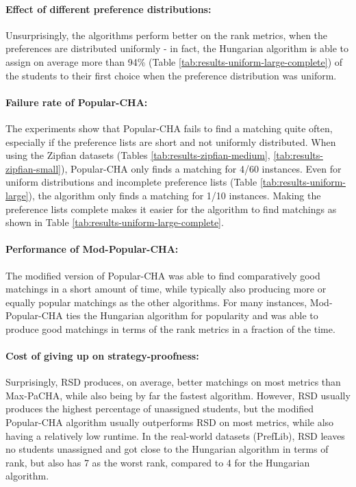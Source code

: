\paragraph{Effect of different preference distributions:} Unsurprisingly, the algorithms perform better on the rank metrics, when the preferences are distributed uniformly - in fact, the Hungarian algorithm is able to assign on average more than 94\% (Table \ref{tab:results-uniform-large-complete}) of the students to their first choice when the preference distribution was uniform.
\paragraph{Failure rate of Popular-CHA:} The experiments show that \mbox{Popular-CHA} fails to find a matching quite often, especially if the preference lists are short and not uniformly distributed. When using the Zipfian datasets (Tables \ref{tab:results-zipfian-medium}, \ref{tab:results-zipfian-small}), Popular-CHA only finds a matching for 4/60 instances. Even for uniform distributions and incomplete preference lists (Table \ref{tab:results-uniform-large}), the algorithm only finds a matching for 1/10 instances. Making the preference lists complete makes it easier for the algorithm to find matchings as shown in Table \ref{tab:results-uniform-large-complete}.
\paragraph{Performance of Mod-Popular-CHA:} The modified version of Popular-CHA was able to find comparatively good matchings in a short amount of time, while typically also producing more or equally popular matchings as the other algorithms. For many instances, Mod-Popular-CHA ties the Hungarian algorithm for popularity and was able to produce good matchings in terms of the rank metrics in a fraction of the time.
\paragraph{Cost of giving up on strategy-proofness:} Surprisingly, RSD produces, on average, better matchings on most metrics than Max-PaCHA, while also being by far the fastest algorithm. However, RSD usually produces the highest percentage of unassigned students, but the modified Popular-CHA algorithm usually outperforms RSD on most metrics, while also having a relatively low runtime. In the real-world datasets (PrefLib), RSD leaves no students unassigned and got close to the Hungarian algorithm in terms of rank, but also has 7 as the worst rank, compared to 4 for the Hungarian algorithm. 
